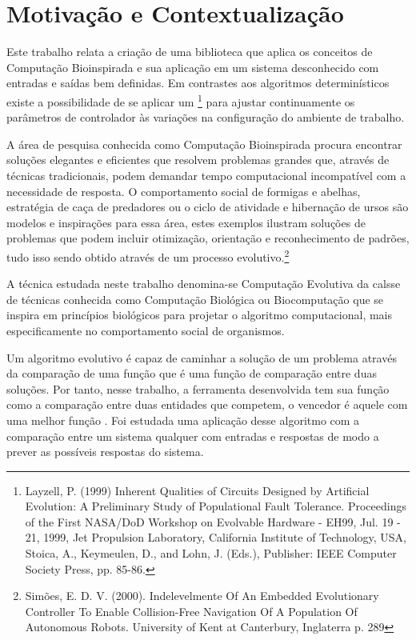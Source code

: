\section{Motivação e Contextualização}

\newcommand\SE{\sigla{SE}{Sistema Evolutivo}\xspace}

Este trabalho relata a criação de uma biblioteca que aplica os conceitos de Computação Bioinspirada e sua aplicação em um sistema desconhecido com entradas e saídas bem definidas. Em contrastes aos algoritmos determinísticos existe a possibilidade de se aplicar um \SE\footnote{Layzell, P. (1999) Inherent Qualities of Circuits Designed by Artificial Evolution: A Preliminary Study of Populational Fault Tolerance. Proceedings of the First NASA/DoD Workshop on Evolvable Hardware - EH99, Jul. 19 - 21, 1999, Jet Propulsion Laboratory, California Institute of Technology, USA, Stoica, A., Keymeulen, D., and Lohn, J. (Eds.), Publisher: IEEE Computer Society Press, pp. 85-86.} para ajustar continuamente os parâmetros de controlador às variações na configuração do ambiente de trabalho.

A área de pesquisa conhecida como Computação Bioinspirada procura encontrar soluções elegantes e eficientes que resolvem problemas grandes que, através de técnicas tradicionais, podem demandar tempo computacional incompatível com a necessidade de resposta. O comportamento social de formigas e abelhas, estratégia de caça de predadores ou o ciclo de atividade e hibernação de ursos são modelos e inspirações para essa área, estes exemplos ilustram soluções de problemas que podem incluir otimização, orientação e reconhecimento de padrões, tudo isso sendo obtido através de um processo evolutivo.\footnote{Simões, E. D. V. (2000). Indelevelmente Of An Embedded Evolutionary Controller To Enable Collision-Free Navigation Of A Population Of Autonomous Robots. University of Kent at Canterbury, Inglaterra p. 289}

A técnica estudada neste trabalho denomina-se Computação Evolutiva da calsse de técnicas conhecida como Computação Biológica ou Biocomputação que se inspira em princípios biológicos para projetar o algoritmo computacional, mais especificamente no comportamento social de organismos.

Um algoritmo evolutivo é capaz de caminhar a solução de um problema através da comparação de uma função \fitness que é uma função de comparação entre duas soluções. Por tanto, nesse trabalho, a ferramenta desenvolvida tem sua função \fitness como a comparação entre duas entidades que competem, o vencedor é aquele com uma melhor função \fitness. Foi estudada uma aplicação desse algoritmo com a comparação entre um sistema qualquer com entradas e respostas de modo a prever as possíveis respostas do sistema.

